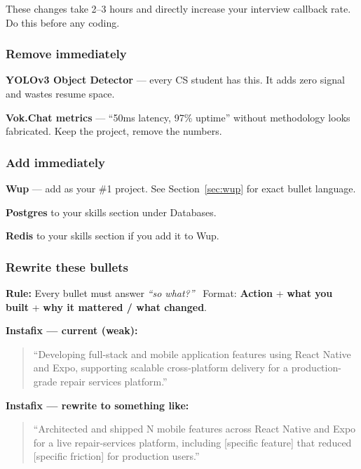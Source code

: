 \documentclass[11pt, a4paper]{article}
\begin{document}
These changes take 2–3 hours and directly increase your interview callback rate. Do this before any coding.

\subsubsection{Remove immediately}
\begin{checklist}
  \item \textbf{YOLOv3 Object Detector} — every CS student has this. It adds zero signal and wastes resume space.
  \item \textbf{Vok.Chat metrics} — ``50ms latency, 97\% uptime'' without methodology looks fabricated. Keep the project, remove the numbers.
\end{checklist}

\subsubsection{Add immediately}
\begin{checklist}
  \item \textbf{Wup} — add as your \#1 project. See Section~\ref{sec:wup} for exact bullet language.
  \item \textbf{Postgres} to your skills section under Databases.
  \item \textbf{Redis} to your skills section if you add it to Wup.
\end{checklist}

\subsubsection{Rewrite these bullets}

\begin{warningbox}
\textbf{Rule:} Every bullet must answer \textit{``so what?''} \ Format: \textbf{Action} + \textbf{what you built} + \textbf{why it mattered / what changed}.
\end{warningbox}

\vspace{6pt}

\noindent\textbf{Instafix — current (weak):}
\begin{quote}
\color{danger}\small ``Developing full-stack and mobile application features using React Native and Expo, supporting scalable cross-platform delivery for a production-grade repair services platform.''
\end{quote}

\noindent\textbf{Instafix — rewrite to something like:}
\begin{quote}
\color{success}\small ``Architected and shipped N mobile features across React Native and Expo for a live repair-services platform, including [specific feature] that reduced [specific friction] for production users.''
\end{quote}
\end{document}
